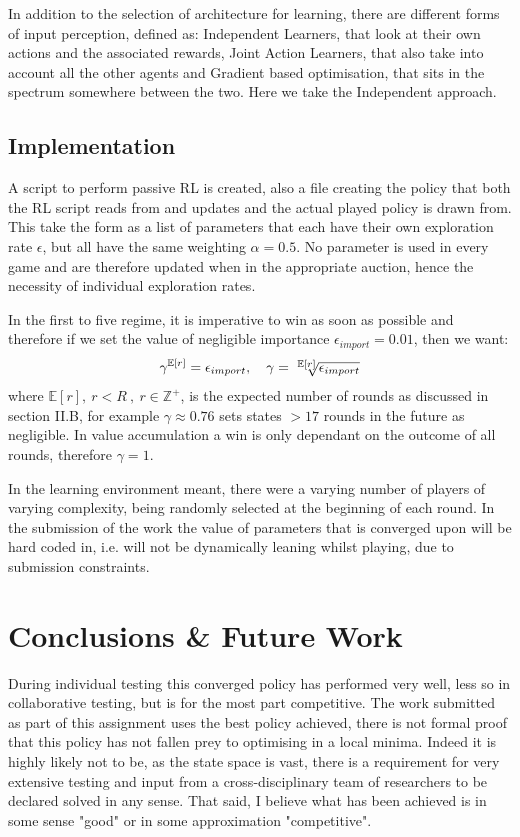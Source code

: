 \documentclass[10pt,conference,twocolumn]{IEEEtran}
\begin{document}
In addition to the selection of architecture for learning, there are different forms of input perception, defined as: Independent Learners, that look at their own actions and the associated rewards, Joint Action Learners, that also take into account all the other agents and Gradient based optimisation, that sits in the spectrum somewhere between the two. Here we take the Independent approach.

\subsection{Implementation}
A script to perform passive RL is created, also a file creating the policy that both the RL script reads from and updates and the actual played policy is drawn from. This take the form as a list of parameters that each have their own exploration rate $\epsilon$, but all have the same weighting $\alpha = 0.5$. No parameter is used in every game and are therefore updated when in the appropriate auction, hence the necessity of individual exploration rates.

In the first to five regime, it is imperative to win as soon as possible and therefore if we set the value of negligible importance $\epsilon_{import} = 0.01$, then we want: $$\gamma^{\mathbb{E}[r]} =\epsilon_{import}, \quad \gamma = \sqrt[\leftroot{-1}\uproot{2}\scriptstyle {\mathbb{E}[r]}]{\epsilon_{import}}$$ where $\mathbb{E}[r],\: r<R \: , \: r \in \mathbb{Z}^+$, is the expected number of rounds as discussed in section II.B, for example $\gamma \approx 0.76$ sets states $>17$ rounds in the future as negligible. In value accumulation a win is only dependant on the outcome of all rounds, therefore $\gamma = 1$. 

In the learning environment meant, there were a varying number of players of varying complexity, being randomly selected at the beginning of each round. In the submission of the work the value of parameters that is converged upon will be hard coded in, i.e. will not be dynamically leaning whilst playing, due to submission constraints.

\section{Conclusions \& Future Work}

During individual testing this converged policy has performed very well, less so in collaborative testing, but is for the most part competitive. The work submitted as part of this assignment uses the best policy achieved, there is not formal proof that this policy has not fallen prey to optimising in a local minima. Indeed it is highly likely not to be, as the state space is vast, there is a requirement for very extensive testing and input from a cross-disciplinary team of researchers to be declared solved in any sense. That said, I believe what has been achieved is in some sense "good" or in some approximation "competitive".
\end{document}
